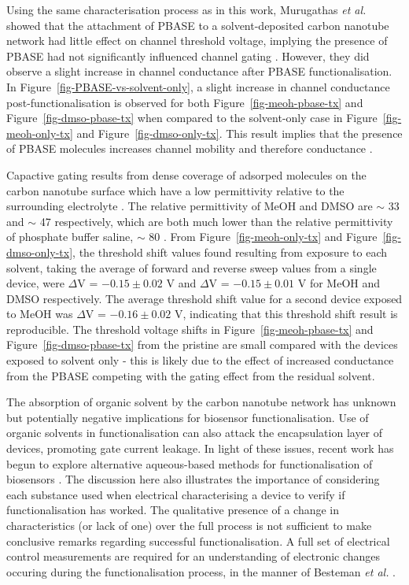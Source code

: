 \documentclass[
  a4paper,
]{scrbook}
\begin{document}
Using the same characterisation process as in this work, Murugathas
\emph{et al.} \autocite{Murugathas2019b} showed that the attachment of
PBASE to a solvent-deposited carbon nanotube network had little effect
on channel threshold voltage, implying the presence of PBASE had not
significantly influenced channel gating \autocite{Murugathas2019b}.
However, they did observe a slight increase in channel conductance after
PBASE functionalisation. In Figure~\ref{fig-PBASE-vs-solvent-only}, a
slight increase in channel conductance post-functionalisation is
observed for both Figure~\ref{fig-meoh-pbase-tx} and
Figure~\ref{fig-dmso-pbase-tx} when compared to the solvent-only case in
Figure~\ref{fig-meoh-only-tx} and Figure~\ref{fig-dmso-only-tx}. This
result implies that the presence of PBASE molecules increases channel
mobility and therefore conductance \autocite{Heller2008}.

Capactive gating results from dense coverage of adsorped molecules on
the carbon nanotube surface which have a low permittivity relative to
the surrounding electrolyte \autocite{Heller2008}. The relative
permittivity of MeOH and DMSO are \(\sim\) 33 \autocite{Mohsen-Nia2010}
and \(\sim\) 47 \autocite{Hunger2010} respectively, which are both much
lower than the relative permittivity of phosphate buffer saline,
\(\sim\) 80 \autocite{Shkodra2021}. From Figure~\ref{fig-meoh-only-tx}
and Figure~\ref{fig-dmso-only-tx}, the threshold shift values found
resulting from exposure to each solvent, taking the average of forward
and reverse sweep values from a single device, were \(\Delta\)V =
\(-0.15 \pm 0.02\) V and \(\Delta\)V = \(-0.15 \pm 0.01\) V for MeOH and
DMSO respectively. The average threshold shift value for a second device
exposed to MeOH was \(\Delta\)V = \(-0.16 \pm 0.02\) V, indicating that
this threshold shift result is reproducible. The threshold voltage
shifts in Figure~\ref{fig-meoh-pbase-tx} and
Figure~\ref{fig-dmso-pbase-tx} from the pristine are small compared with
the devices exposed to solvent only - this is likely due to the effect
of increased conductance from the PBASE competing with the gating effect
from the residual solvent.

The absorption of organic solvent by the carbon nanotube network has
unknown but potentially negative implications for biosensor
functionalisation. Use of organic solvents in functionalisation can also
attack the encapsulation layer of devices, promoting gate current
leakage. In light of these issues, recent work has begun to explore
alternative aqueous-based methods for functionalisation of biosensors
\autocite{Khan2021}. The discussion here also illustrates the importance
of considering each substance used when electrical characterising a
device to verify if functionalisation has worked. The qualitative
presence of a change in characteristics (or lack of one) over the full
process is not sufficient to make conclusive remarks regarding
successful functionalisation. A full set of electrical control
measurements are required for an understanding of electronic changes
occuring during the functionalisation process, in the manner of Besteman
\emph{et al.} \autocite{Besteman2003}.
\end{document}
